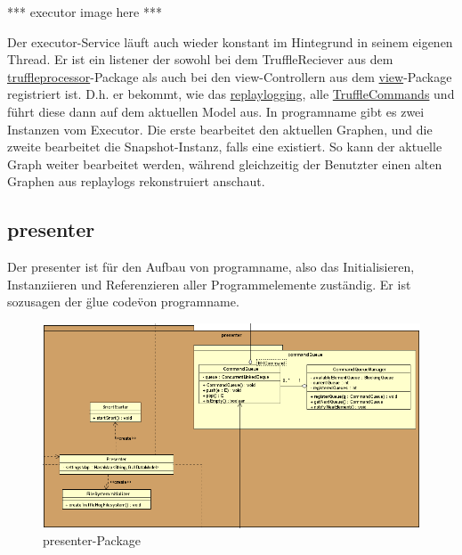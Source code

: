     *** executor image here ***
    \newline
    \newline

    Der executor-Service läuft auch wieder konstant im Hintegrund in seinem
    eigenen Thread. Er ist ein \gls{listener} der sowohl bei dem TruffleReciever aus dem
    \hyperref[subsubsec:truffleprocessor]{truffleprocessor}-Package als
    auch bei den view-Controllern aus dem \hyperref[subsec:view]{view}-Package
    registriert ist. D.h. er bekommt, wie das \hyperref[subsubsec:replaylogging]{replaylogging},
    alle \hyperref[subsubsec:trufflecommand]{TruffleCommands} und führt diese
    dann auf dem aktuellen Model aus.
    \newline
    \newline
    In \gls{programname} gibt es zwei Instanzen vom Executor. Die erste bearbeitet
    den aktuellen Graphen, und die zweite bearbeitet die Snapshot-Instanz, falls
    eine existiert. So kann der aktuelle Graph weiter bearbeitet werden, während
    gleichzeitig der Benutzter einen alten Graphen aus 
    \glspl{replaylog} rekonstruiert anschaut.


\subsection{presenter}
\label{subsec:presenter}

Der presenter ist für den Aufbau von \gls{programname}, also das
Initialisieren, Instanziieren und Referenzieren aller Programmelemente zuständig.
Er ist sozusagen der \"glue code\" von \gls{programname}.

\begin{figure}[H]
  \centering
  \includegraphics[width=\textwidth]{../diagramimages/presenter.png}
  \caption{presenter-Package}
\end{figure}

